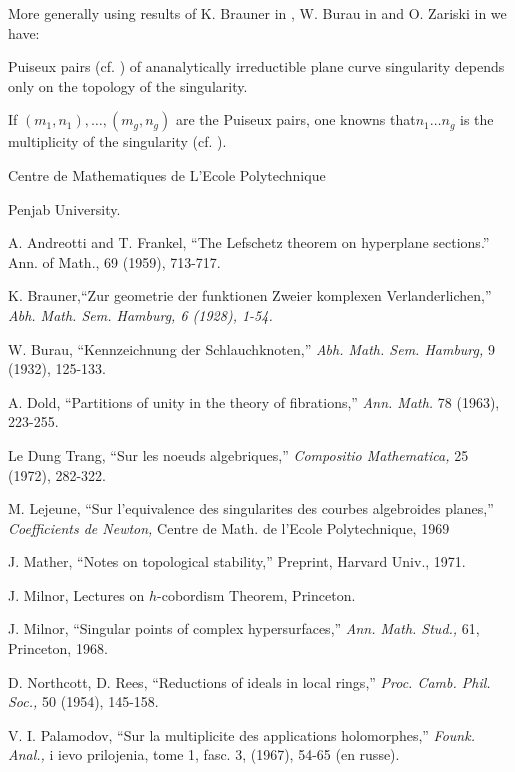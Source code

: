 More generally using results of K. Brauner in \cite{art10-key2}, W. Burau in \cite{art10-key3} and O. Zariski in \cite{art10-key18} we have:

\begin{thm}\label{art10-thm3.2}
Puiseux pairs (cf. \cite{art10-key5}) of ananalytically irreductible plane curve singularity depends only on the topology of the singularity. 
\end{thm}

If $(m_1,n_1), \ldots, (m_g, n_g)$ are the Puiseux pairs, one knowns that\break $n_1 \ldots n_g$ is the multiplicity of the singularity (cf. \cite{art10-key5}).

Centre de Mathematiques de L'Ecole Polytechnique

Penjab University.


\begin{thebibliography}{99}
 A. Andreotti and T. Frankel, ``The Lefschetz theorem on hyperplane sections.'' Ann. of Math., 69 (1959), 713-717.

 K. Brauner,\pageoriginale ``Zur geometrie der funktionen Zweier komplexen Verlanderlichen,'' {\em Abh. Math. Sem. Hamburg, 6 (1928), 1-54.}

 W. Burau, ``Kennzeichnung der Schlauchknoten,'' {\em Abh. Math. Sem. Hamburg, } 9 (1932), 125-133.

 A. Dold, ``Partitions of unity in the theory of fibrations,'' {\em Ann. Math.} 78 (1963), 223-255.

 Le Dung Trang, ``Sur les noeuds algebriques,'' {\em Compositio Mathematica,} 25 (1972), 282-322. 

 M. Lejeune, ``Sur l'equivalence des singularites des courbes algebroides planes,'' {\em Coefficients de Newton, } Centre de Math. de l'Ecole Polytechnique, 1969

 J. Mather, ``Notes on topological stability,'' Preprint, Harvard Univ., 1971.

 J. Milnor, Lectures on $h$-cobordism Theorem, Princeton.

 J. Milnor, ``Singular points of complex hypersurfaces,'' {\em Ann. Math. Stud.,} 61, Princeton, 1968.

 D. Northcott, D. Rees, ``Reductions of ideals in local rings,'' {\em Proc. Camb. Phil. Soc.,} 50 (1954), 145-158.

 V. I. Palamodov, ``Sur la multiplicite des applications holomorphes,'' {\em Founk. Anal.,} i ievo prilojenia, tome 1, fasc. 3, (1967), 54-65 (en russe).


\end{thebibliography}
